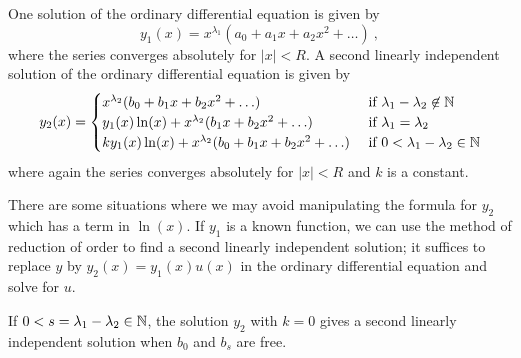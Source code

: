 One solution of the ordinary differential equation is given by
\[
y_1(x) = x^{\lambda_1}(a_0 + a_1 x + a_2 x^2 + \ldots) \ ,
\]
where the series converges absolutely for $|x|<R$.  A second linearly
independent solution of the ordinary differential equation is given by
\begin{equation} \label{spv_FMchoices}
y_2(x) =
\begin{cases}
x^{\lambda_2} ( b_0 + b_1 x + b_2 x^2 + \ldots ) & \text{ if } 
\lambda_1 - \lambda_2 \not\in \mathbb{N} \\
y_1(x) \ln(x) + x^{\lambda_2} ( b_1 x + b_2 x^2 + \ldots ) &
\text{ if } \lambda_1 = \lambda_2 \\
k y_1(x) \ln(x) + x^{\lambda_2} ( b_0 + b_1 x + b_2 x^2 + \ldots ) &
\text{ if } 0<\lambda_1 - \lambda_2 \in \mathbb{N}
\end{cases}
\end{equation}
where again the series converges absolutely for $|x|<R$ and $k$ is a constant.

There are some situations where we may avoid manipulating the
formula for $y_2$ which has a term in $\ln(x)$.  If $y_1$ is a known
function, we can use the method of reduction of order to find a
second linearly independent solution; it suffices to replace $y$ by
$y_2(x) = y_1(x) u(x)$ in the ordinary differential equation and solve for $u$.

If $0<s = \lambda_1-\lambda_2 \in \mathbb{N}$, the solution $y_2$ with $k=0$
gives a second linearly independent solution when $b_0$ and $b_s$ are
free.

